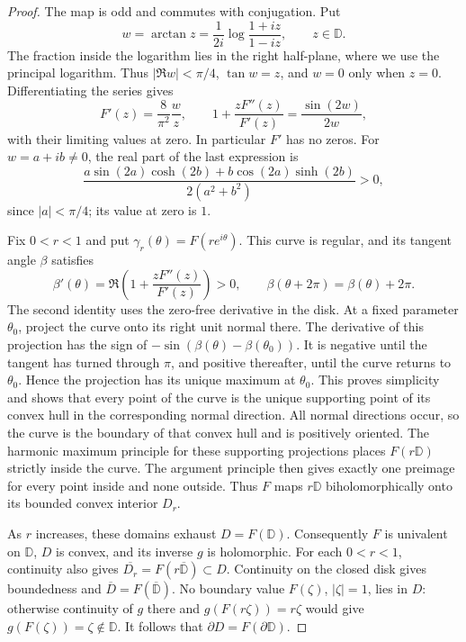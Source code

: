 \begin{proof}
The map is odd and commutes with conjugation. Put
\[
 w=\arctan z=\frac1{2i}\log\frac{1+iz}{1-iz},\qquad z\in\mathbb D.
\]
The fraction inside the logarithm lies in the right half-plane, where
we use the principal logarithm. Thus $|\Re w|<\pi/4$, $\tan w=z$,
and $w=0$ only when $z=0$. Differentiating the series gives
\begin{equation}\label{eq:lens-derivatives}
 F'(z)=\frac8{\pi^2}\frac wz,\qquad
 1+\frac{zF''(z)}{F'(z)}=\frac{\sin(2w)}{2w},
\end{equation}
with their limiting values at zero. In particular $F'$ has no zeros.
For $w=a+ib\ne0$, the real part of the last expression is
\[
 \frac{a\sin(2a)\cosh(2b)+b\cos(2a)\sinh(2b)}{2(a^2+b^2)}>0,
\]
since $|a|<\pi/4$; its value at zero is $1$.

Fix $0<r<1$ and put $\gamma_r(\theta)=F(re^{i\theta})$.
This curve is regular, and its tangent angle $\beta$ satisfies
\[
 \beta'(\theta)=\Re\!\left(1+\frac{zF''(z)}{F'(z)}\right)>0,
 \qquad \beta(\theta+2\pi)=\beta(\theta)+2\pi.
\]
The second identity uses the zero-free derivative in the disk.
At a fixed parameter $\theta_0$, project the curve onto its right unit
normal there. The derivative of this projection has the sign of
$-\sin(\beta(\theta)-\beta(\theta_0))$. It is negative until the tangent
has turned through $\pi$, and positive thereafter, until the curve
returns to $\theta_0$. Hence the projection has its unique maximum at
$\theta_0$. This proves simplicity and shows that every point of the
curve is the unique supporting point of its convex hull in the
corresponding normal direction. All normal directions occur, so the
curve is the boundary of that convex hull and is positively oriented.
The harmonic maximum principle for these supporting projections places
$F(r\mathbb D)$ strictly inside the curve. The argument principle then
gives exactly one preimage for every point inside and none outside.
Thus $F$ maps $r\mathbb D$ biholomorphically onto its bounded convex
interior $D_r$.

As $r$ increases, these domains exhaust $D=F(\mathbb D)$. Consequently
$F$ is univalent on $\mathbb D$, $D$ is convex, and its inverse $g$ is
holomorphic. For each $0<r<1$, continuity also gives
$\overline{D_r}=F(r\overline{\mathbb D})\subset D$.
Continuity on the closed disk gives boundedness and
$\overline D=F(\overline{\mathbb D})$. No boundary value $F(\zeta)$,
$|\zeta|=1$, lies in $D$: otherwise continuity of $g$ there and
$g(F(r\zeta))=r\zeta$ would give $g(F(\zeta))=\zeta\notin\mathbb D$.
It follows that $\partial D=F(\partial\mathbb D)$.


\end{proof}
